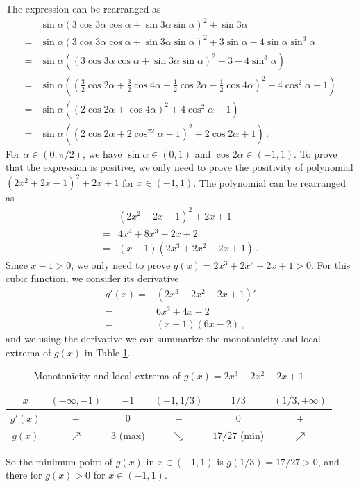 \documentclass[]{article}
\begin{document}
The expression can be rearranged as
\begin{align*}
&\sin\alpha(3\cos3\alpha\cos\alpha + \sin3\alpha\sin\alpha)^2+\sin3\alpha \\
=&\sin\alpha(3\cos3\alpha\cos\alpha + \sin3\alpha\sin\alpha)^2 + 3\sin\alpha-4\sin\alpha\sin^3\alpha \\
=&\sin\alpha((3\cos3\alpha\cos\alpha + \sin3\alpha\sin\alpha)^2 + 3-4\sin^3\alpha) \\
=&\sin\alpha((\frac{3}{2}\cos2\alpha+\frac{3}{2}\cos4\alpha+\frac{1}{2}\cos2\alpha-\frac{1}{2}\cos4\alpha)^2 + 4\cos^2\alpha-1)\\
=&\sin\alpha((2\cos2\alpha+\cos4\alpha)^2 + 4\cos^2\alpha-1)\\
=&\sin\alpha((2\cos2\alpha+2\cos^22\alpha-1)^2 + 2\cos2\alpha+1)\,.
\end{align*}
For $\alpha\in(0, \pi/2)$, we have $\sin\alpha\in(0, 1)$ and $\cos2\alpha\in(-1, 1)$. To prove that the expression is positive, we only need to prove the positivity of polynomial $(2x^2+2x-1)^2+2x+1$ for $x \in (-1,1)$. The polynomial can be rearranged as
\begin{align*}
&(2x^2+2x-1)^2+2x+1\\
=&4x^4+8x^3-2x+2\\
=&(x-1)(2x^3+2x^2-2x+1)\,.
\end{align*}
Since $x-1>0$, we only need to prove $g(x) = 2x^3+2x^2-2x+1 > 0$. For this cubic function, we consider its derivative
\begin{align*}
g'(x)=&(2x^3+2x^2-2x+1)'\\
=&6x^2+4x-2\\
=&(x+1)(6x-2)\,,
\end{align*}
and we using the derivative we can summarize the monotonicity and local extrema of $g(x)$ in Table \ref{tab:g}.
\begin{table}[!h]
	\centering
	\caption{Monotonicity and local extrema of $g(x) = 2x^3+2x^2-2x+1$}
	\begin{tabular}{c|ccccc}
		\hline
		$x$&$(-\infty,-1)$&$-1$&$(-1, 1/3)$&$1/3$&$(1/3, +\infty)$\\
		\hline
		$g'(x)$&$+$&$0$&$-$&$0$&$+$\\
		\hline
		$g(x)$&$\nearrow$&$3$ (max)&$\searrow$&$17/27$ (min)&$\nearrow$\\
		\hline
	\end{tabular}
\label{tab:g}
\end{table}
So the minimum point of $g(x)$ in $x\in(-1,1)$ is $g(1/3) = 17/27 > 0$, and there for $g(x) > 0$ for $x\in(-1,1)$.
\end{document}
